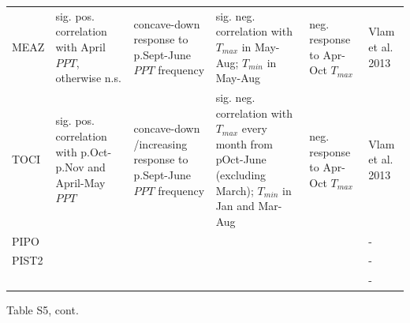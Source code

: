 \documentclass[
]{article}
\begin{document}
\begin{longtable}{l>{\raggedright\arraybackslash}p{2.5cm}>{\raggedright\arraybackslash}p{2.5cm}>{\raggedright\arraybackslash}p{2.5cm}>{\raggedright\arraybackslash}p{2.5cm}>{\raggedright\arraybackslash}p{2cm}}
\hspace{1em}MEAZ & sig. pos. correlation with April $PPT$, otherwise n.s. & concave-down response to p.Sept-June $PPT$ frequency & sig. neg. correlation with $T_{max}$ in May-Aug; $T_{min}$ in May-Aug & neg. response to Apr-Oct $T_{max}$ & Vlam et al. 2013\\
\hspace{1em}TOCI & sig. pos. correlation with p.Oct-p.Nov and April-May $PPT$ & concave-down /increasing response to p.Sept-June $PPT$ frequency & sig. neg. correlation with $T_{max}$ every month from pOct-June (excluding March); $T_{min}$ in Jan and Mar-Aug & neg. response to Apr-Oct $T_{max}$ & Vlam et al. 2013\\
PIPO &  &  &  &  & -\\
PIST2 &  &  &  &  & -\\
 &  &  &  &  & -\\
\bottomrule
\end{longtable}
\endgroup{}

\newpage

Table S5, cont. \begingroup\fontsize{7}{9}\selectfont
\end{document}
